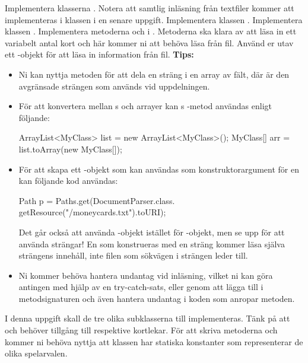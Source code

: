 \Subtask Implementera klasserna . Notera att samtlig inläsning från textfiler kommer att implementeras i klassen  i en senare uppgift.
\newline
\Subtask Implementera klassen .
\newline
\Subtask Implementera klassen .
\newline
\Subtask Implementera metoderna  och  i . Metoderna ska klara av att läsa in ett variabelt antal kort och här kommer ni att behöva läsa från fil.
Använd er utav ett -objekt för att läsa in information från fil.
\newline
\newline
\textbf{Tips:}
\begin{itemize}
\item Ni kan nyttja metoden  för att dela en sträng i en array av fält, där  är den avgränsade strängen som används vid uppdelningen.

\item För att konvertera mellan s och arrayer kan s -metod användas enligt följande:

\begin{Code}
ArrayList<MyClass> list = new ArrayList<MyClass>();
MyClass[] arr = list.toArray(new MyClass[]{});
\end{Code}

\item För att skapa ett -objekt som kan användas som konstruktorargument för en  kan följande kod användas:

\begin{Code}
Path p = Paths.get(DocumentParser.class.
        getResource("/moneycards.txt").toURI);
\end{Code}

Det går också att använda -objekt istället för -objekt, men se upp för att använda strängar! En  som konstrueras med en sträng kommer läsa själva strängens innehåll, inte filen som sökvägen i strängen leder till.

\item Ni kommer behöva hantera undantag  vid inläsning, vilket ni kan göra antingen med hjälp av en try-catch-sats, eller genom att lägga till  i metodsignaturen och även hantera undantag i koden som anropar metoden.

\end{itemize}
\Task I denna uppgift skall de tre olika subklasserna till  implementeras. Tänk på att  och  behöver tillgång till respektive kortlekar.
För att skriva metoderna  och  kommer ni behöva nyttja att klassen  har statiska konstanter som representerar de olika spelarvalen.


